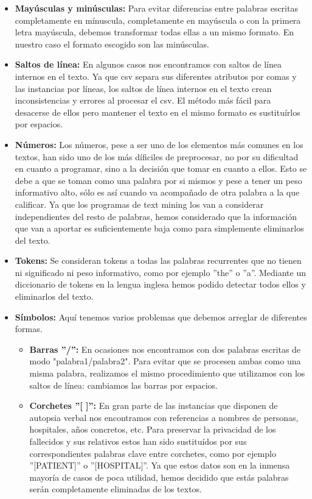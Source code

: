 \documentclass[10pt,a4paper,draft]{article}
\begin{document}
\begin{itemize}
\item \textbf{Mayúsculas y minúsculas:} Para evitar diferencias entre palabras escritas completamente en mínuscula, completamente en mayúscula o con la primera letra mayúscula, debemos transformar todas ellas a un mismo formato. En nuestro caso el formato escogido son las minúsculas.
\item \textbf{Saltos de línea:} En algunos casos nos encontramos con saltos de línea internos en el texto. Ya que csv separa sus diferentes atributos por comas y las instancias por líneas, los saltos de línea internos en el texto crean inconsistencias y errores al procesar el csv. El método más fácil para desacerse de ellos pero mantener el texto en el mismo formato es sustituírlos por espacios.
\item \textbf{Números:} Los números, pese a ser uno de los elementos más comunes en los textos, han sido uno de los más díficiles de preprocesar, no por su dificultad en cuanto a programar, sino a la decisión que tomar en cuanto a ellos. Esto se debe a que se toman como una palabra por si mismos y pese a tener un peso informativo alto, sólo es así cuando va acompañado de otra palabra a la que calificar. Ya que los programas de text mining los van a considerar independientes del resto de palabras, hemos considerado que la información que van a aportar es suficientemente baja como para simplemente eliminarlos del texto.
\item \textbf{Tokens:} Se consideran tokens a todas las palabras recurrentes que no tienen ni significado ni peso informativo, como por ejemplo ''the'' o ''a''. Mediante un diccionario de tokens en la lengua inglesa hemos podido detectar todos ellos y eliminarlos del texto.
\item \textbf{Símbolos:} Aquí tenemos varios problemas que debemos arreglar de diferentes formas.
\begin{itemize} 
\item \textbf{Barras ''/'':} En ocasiones nos encontramos con dos palabras escritas de modo "palabra1/palabra2". Para evitar que se procesen ambas como una misma palabra, realizamos el mismo procedimiento que utilizamos con los saltos de línea: cambiamos las barras por espacios.
\item \textbf{Corchetes ''[ ]'':} En gran parte de las instancias que disponen de autopsia verbal nos encontramos con referencias a nombres de personas, hospitales, años concretos, etc. Para preservar la privacidad de los fallecidos y sus relativos estos han sido sustituídos por sus correspondientes palabras clave entre corchetes, como por ejemplo ''[PATIENT]'' o ''[HOSPITAL]''. Ya que estos datos son en la inmensa mayoría de casos de poca utilidad, hemos decidido que estás palabras serán completamente eliminadas de los textos.
\end{itemize}
\end{itemize}
\end{document}
